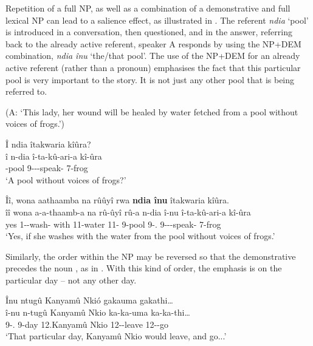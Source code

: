 \documentclass[output=paper]{langscibook}
\begin{document}
Repetition of a full NP, as well as a combination of a demonstrative and full lexical NP can lead to a salience effect, as illustrated in . The referent \textit{ndia} ‘pool’ is introduced in a conversation, then questioned, and in the answer, referring back to the already active referent, speaker A responds by using the NP+DEM combination, \textit{ndia înu} ‘the/that pool’. The use of the NP+DEM for an already active referent (rather than a pronoun) emphasises the fact that this particular pool is very important to the story. It is not just any other pool that is being referred to.

\ea
\label{bkm:Ref125199305}
(A: ‘This lady, her wound will be healed by water fetched from a pool without voices of frogs.’)\\
\begin{xlist}
Î ndia îtakwaria kîûra?\\
\gll
î  n-dia  î-ta-kû-ari-a  kî-ûra\\
-pool 9\SM-\NEG{}-\PRS{}-speak-\FV{} 7-frog\\
\glt
‘A pool without voices of frogs?’


Îî, wona aathaamba na rûûyî rwa \textbf{ndia înu} îtakwaria kîûra.\\
\gll
îî  wona  a-a-thaamb-a  na  rû-ûyî  rû-a n-dia  î-nu î-ta-kû-ari-a  kî-ûra\\
yes  \COND{} 1\SM-\PST{}-wash-\FV{} with  11-water  11-\CONN{} 9-pool  9-\DEM.\MED{} 9\SM{}-\NEG{}-\PRS{}-speak-\FV{} 7-frog\\
\glt
‘Yes, if she washes with the water from the pool without voices of frogs.’


\end{xlist}
\z

Similarly, the order within the NP may be reversed so that the demonstrative precedes the noun \citep[see][]{KanampiuMuriungi2019}, as in . With this kind of order, the emphasis is on the particular day – not any other day.

\ea
\label{bkm:Ref116894087}
Înu ntugû Kanyamû Nkió gakauma gakathi…\\
\gll
î-nu  n-tugû  Kanyamû  Nkio  ka-ka-uma  ka-ka-thi…\\
9-\DEM.\MED{} 9-day  12.Kanyamû  Nkio 12\SM{}-\SUBS{}-leave 12\SM{}-\SUBS{}-go\\
\glt
‘That particular day, Kanyamû Nkio would leave, and go...’
\end{document}
